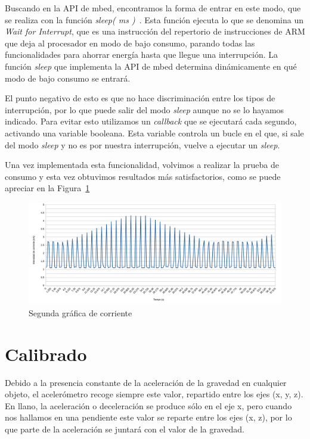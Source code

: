 Buscando en la API de mbed, encontramos la forma de entrar en este modo, que se realiza con la función \textit{sleep( ms )}~\cite{APIDeepSleep}. Esta función ejecuta lo que se denomina un \textit{Wait for Interrupt}, que es una instrucción del repertorio de instrucciones de ARM que deja al procesador en modo de bajo consumo, parando todas las funcionalidades para ahorrar energía hasta que llegue una interrupción. La función \textit{sleep} que implementa la API de mbed determina dinámicamente en qué modo de bajo consumo se entrará.

El punto negativo de esto es que no hace discriminación entre los tipos de interrupción, por lo que puede salir del modo \textit{sleep} aunque no se lo hayamos indicado. Para evitar esto utilizamos un \textit{callback} que se ejecutará cada segundo, activando una variable booleana. Esta variable controla un bucle en el que, si sale del modo \textit{sleep} y no es por nuestra interrupción, vuelve a ejecutar un \textit{sleep}.

Una vez implementada esta funcionalidad, volvimos a realizar la prueba de consumo y esta vez obtuvimos resultados más satisfactorios, como se puede apreciar en la Figura~\ref{figuraConsumoJunio}

\begin{figure}[h]%
	\centering
    \includegraphics[width=\textwidth]{figures/consumo_junio2.png}
    \caption[Segunda gráfica de corriente]{Segunda gráfica de corriente}
   	\label{figuraConsumoJunio}
\end{figure}


\section{Calibrado}

Debido a la presencia constante de la aceleración de la gravedad en cualquier objeto, el acelerómetro recoge siempre este valor, repartido entre los ejes (x, y, z). En llano, la aceleración o deceleración se produce sólo en el eje x, pero cuando nos hallamos en una pendiente este valor se reparte entre los ejes (x, z), por lo que parte de la aceleración se juntará con el valor de la gravedad.

